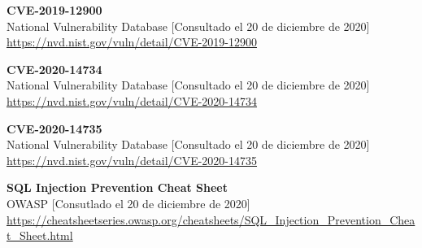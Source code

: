\documentclass[a4paper,oneside]{article}
\begin{document}
\begin{thebibliography}{9}
	\textbf{CVE-2019-12900}\\
	National Vulnerability Database [Consultado el 20 de diciembre de 2020]\\
	\url{https://nvd.nist.gov/vuln/detail/CVE-2019-12900}

	\textbf{CVE-2020-14734}\\
	National Vulnerability Database [Consultado el 20 de diciembre de 2020]\\
	\url{https://nvd.nist.gov/vuln/detail/CVE-2020-14734}

	\textbf{CVE-2020-14735}\\
	National Vulnerability Database [Consultado el 20 de diciembre de 2020]\\
	\url{https://nvd.nist.gov/vuln/detail/CVE-2020-14735}
	
	\textbf{SQL Injection Prevention Cheat Sheet}\\
	OWASP [Consutlado el 20 de diciembre de 2020]\\
	\url{https://cheatsheetseries.owasp.org/cheatsheets/SQL_Injection_Prevention_Cheat_Sheet.html}

\end{thebibliography}
\end{document}
